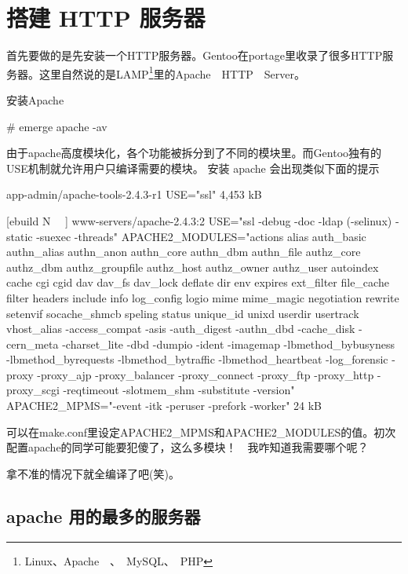 

\section{搭建 HTTP 服务器}

首先要做的是先安装一个HTTP服务器。Gentoo在portage里收录了很多HTTP服务器。这里自然说的是LAMP\footnote{Linux、Apache　、　MySQL、　PHP}里的Apache　HTTP　Server。

\begin{example}{安装Apache}
\begin{code}
\# emerge apache -av
\end{code}

由于apache高度模块化，各个功能被拆分到了不同的模块里。而Gentoo独有的USE机制就允许用户只编译需要的模块。
安装 apache 会出现类似下面的提示
\begin{code}
[ebuild  N     ] app-admin/apache-tools-2.4.3-r1  USE="ssl" 4,453 kB

[ebuild  N    　] www-servers/apache-2.4.3:2  USE="ssl -debug -doc -ldap (-selinux) -static -suexec -threads" APACHE2\_MODULES="actions alias auth\_basic authn\_alias authn\_anon authn\_core authn\_dbm authn\_file authz\_core authz\_dbm authz\_groupfile authz\_host authz\_owner authz\_user autoindex cache cgi cgid dav dav\_fs dav\_lock deflate dir env expires ext\_filter file\_cache filter headers include info log\_config logio mime mime\_magic negotiation rewrite setenvif socache\_shmcb speling status unique\_id unixd userdir usertrack vhost\_alias -access\_compat -asis -auth\_digest -authn\_dbd -cache\_disk -cern\_meta -charset\_lite -dbd -dumpio -ident -imagemap -lbmethod\_bybusyness -lbmethod\_byrequests -lbmethod\_bytraffic -lbmethod\_heartbeat -log\_forensic -proxy -proxy\_ajp -proxy\_balancer -proxy\_connect -proxy\_ftp -proxy\_http -proxy\_scgi -reqtimeout -slotmem\_shm -substitute -version" APACHE2\_MPMS="-event -itk -peruser -prefork -worker" 24 kB
\end{code}

可以在make.conf里设定APACHE2\_MPMS和APACHE2\_MODULES的值。初次配置apache的同学可能要犯傻了，这么多模块！　我咋知道我需要哪个呢？

拿不准的情况下就全编译了吧(笑)。

\end{example}




\subsection{  apache 用的最多的服务器}
